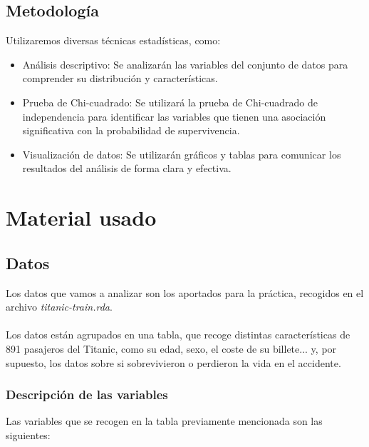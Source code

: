 \documentclass{article}
\begin{document}
\subsection{Metodología}
Utilizaremos diversas técnicas estadísticas, como:
\begin{itemize}
    \item Análisis descriptivo: Se analizarán las variables del conjunto de datos para comprender su distribución y características.
    \item Prueba de Chi-cuadrado: Se utilizará la prueba de Chi-cuadrado de independencia para identificar las variables que tienen una asociación significativa con la probabilidad de supervivencia.
    \item Visualización de datos: Se utilizarán gráficos y tablas para comunicar los resultados del análisis de forma clara y efectiva.
\end{itemize}

\section{Material usado}

\subsection{Datos}

Los datos que vamos a analizar son los aportados para la práctica, recogidos en el archivo \textit{titanic-train.rda}.\\\\
Los datos están agrupados en una tabla, que recoge distintas características de 891 pasajeros del Titanic, como su edad, sexo, el coste de su billete... y, por supuesto, los datos sobre si sobrevivieron o perdieron la vida en el accidente.

\subsubsection{Descripción de las variables}

Las variables que se recogen en la tabla previamente mencionada son las\\siguientes:
\end{document}
